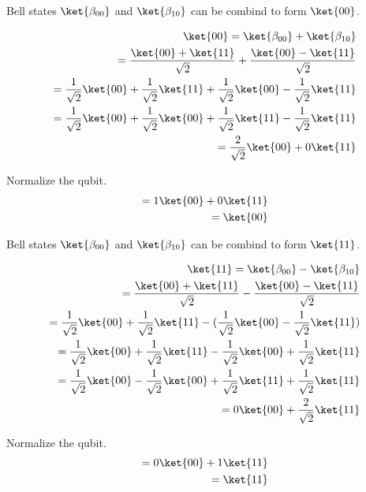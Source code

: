 \documentclass[]{article}
\begin{document}
\begin{enumerate}
        Bell states $\ket{\beta_{00}}$ and $\ket{\beta_{10}}$ can be combind to form $\ket{00}$.

        \begin{align*}
          \ket{00} = \ket{\beta_{00}} + \ket{\beta_{10}} \\
          = \frac{\ket{00} + \ket{11}}{\sqrt{2}} + \frac{\ket{00} - \ket{11}}{\sqrt{2}} \\
          = \frac{1}{\sqrt{2}} \ket{00} + \frac{1}{\sqrt{2}} \ket{11} + \frac{1}{\sqrt{2}} \ket{00} - \frac{1}{\sqrt{2}} \ket{11} \\ 
          = \frac{1}{\sqrt{2}} \ket{00} + \frac{1}{\sqrt{2}} \ket{00} + \frac{1}{\sqrt{2}} \ket{11} - \frac{1}{\sqrt{2}} \ket{11} \\  
          = \frac{2}{\sqrt{2}} \ket{00} + 0 \ket{11} \\
        \end{align*}

        Normalize the qubit.
        \begin{align*}
          = 1 \ket{00} + 0 \ket{11} \\ 
          = \ket{00}
        \end{align*}

        Bell states $\ket{\beta_{00}}$ and $\ket{\beta_{10}}$ can be combind to form $\ket{11}$.

        \begin{align*}
          \ket{11} = \ket{\beta_{00}} - \ket{\beta_{10}} \\
          = \frac{\ket{00} + \ket{11}}{\sqrt{2}} - \frac{\ket{00} - \ket{11}}{\sqrt{2}} \\
          = \frac{1}{\sqrt{2}} \ket{00} + \frac{1}{\sqrt{2}} \ket{11} - (\frac{1}{\sqrt{2}} \ket{00} - \frac{1}{\sqrt{2}} \ket{11}) \\ 
          = \frac{1}{\sqrt{2}} \ket{00} + \frac{1}{\sqrt{2}} \ket{11} - \frac{1}{\sqrt{2}} \ket{00} + \frac{1}{\sqrt{2}} \ket{11} \\ 
          = \frac{1}{\sqrt{2}} \ket{00} - \frac{1}{\sqrt{2}} \ket{00} + \frac{1}{\sqrt{2}} \ket{11} + \frac{1}{\sqrt{2}} \ket{11} \\  
          = 0 \ket{00} + \frac{2}{\sqrt{2}} \ket{11}\\ 
        \end{align*}

        Normalize the qubit.
        \begin{align*}
          = 0 \ket{00} + 1 \ket{11} \\ 
          = \ket{11}
        \end{align*}


\end{enumerate}
\end{document}
